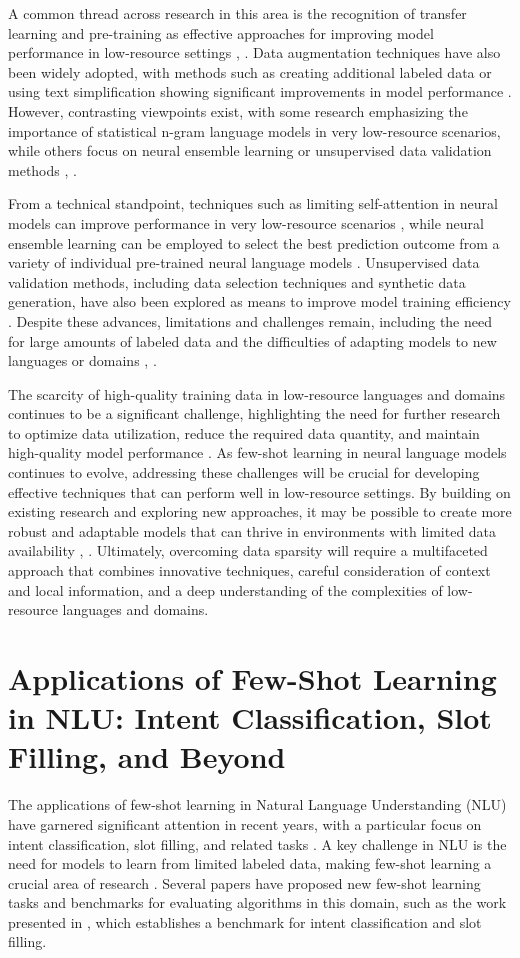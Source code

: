 \documentclass[conference]{IEEEtran}
\begin{document}
A common thread across research in this area is the recognition of transfer learning and pre-training as effective approaches for improving model performance in low-resource settings \cite{b2}, \cite{b4}. Data augmentation techniques have also been widely adopted, with methods such as creating additional labeled data or using text simplification showing significant improvements in model performance \cite{b2}. However, contrasting viewpoints exist, with some research emphasizing the importance of statistical n-gram language models in very low-resource scenarios, while others focus on neural ensemble learning or unsupervised data validation methods \cite{b3}, \cite{b5}.

From a technical standpoint, techniques such as limiting self-attention in neural models can improve performance in very low-resource scenarios \cite{b3}, while neural ensemble learning can be employed to select the best prediction outcome from a variety of individual pre-trained neural language models \cite{b2}. Unsupervised data validation methods, including data selection techniques and synthetic data generation, have also been explored as means to improve model training efficiency \cite{b5}. Despite these advances, limitations and challenges remain, including the need for large amounts of labeled data and the difficulties of adapting models to new languages or domains \cite{b1}, \cite{b5}.

The scarcity of high-quality training data in low-resource languages and domains continues to be a significant challenge, highlighting the need for further research to optimize data utilization, reduce the required data quantity, and maintain high-quality model performance \cite{b5}. As few-shot learning in neural language models continues to evolve, addressing these challenges will be crucial for developing effective techniques that can perform well in low-resource settings. By building on existing research and exploring new approaches, it may be possible to create more robust and adaptable models that can thrive in environments with limited data availability \cite{b1}, \cite{b4}. Ultimately, overcoming data sparsity will require a multifaceted approach that combines innovative techniques, careful consideration of context and local information, and a deep understanding of the complexities of low-resource languages and domains.

\section{Applications of Few-Shot Learning in NLU: Intent Classification, Slot Filling, and Beyond}
The applications of few-shot learning in Natural Language Understanding (NLU) have garnered significant attention in recent years, with a particular focus on intent classification, slot filling, and related tasks \cite{b1}. A key challenge in NLU is the need for models to learn from limited labeled data, making few-shot learning a crucial area of research \cite{b2}. Several papers have proposed new few-shot learning tasks and benchmarks for evaluating algorithms in this domain, such as the work presented in \cite{b3}, which establishes a benchmark for intent classification and slot filling.
\end{document}
